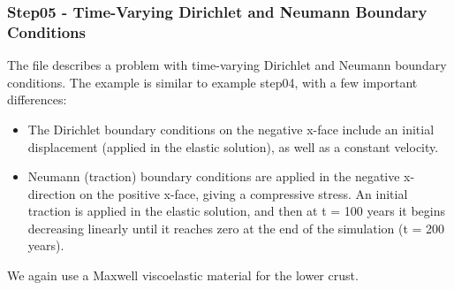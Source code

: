 \subsubsection{Step05 - Time-Varying Dirichlet and Neumann Boundary Conditions}

The  file describes a problem with time-varying
Dirichlet and Neumann boundary conditions. The example is similar
to example step04, with a few important differences:
\begin{itemize}
\item The Dirichlet boundary conditions on the negative x-face include an
  initial displacement (applied in the elastic solution), as well as
  a constant velocity.
\item Neumann (traction) boundary conditions are applied in the negative
  x-direction on the positive x-face, giving a compressive stress. An
  initial traction is applied in the elastic solution, and then at t
  = 100 years it begins decreasing linearly until it reaches zero at
  the end of the simulation (t = 200 years).
\end{itemize}
We again use a Maxwell viscoelastic material for the lower crust.

